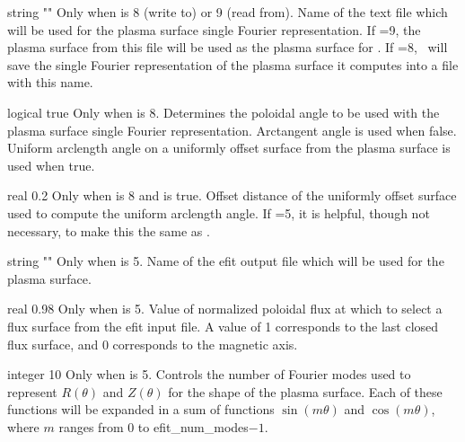 \myhrule

{string}
{{\ttfamily ""}}
{Only when  is 8 (write to) or 9 (read from).}
{Name of the text file which will be used for the plasma surface single Fourier representation. If =9, the plasma surface from
this file will be used as the plasma surface for \regcoil. If =8, \regcoil~will save the single Fourier representation of the plasma surface it computes into a file with this name.}

\myhrule

{logical}
{true}
{Only when  is 8.}
{Determines the poloidal angle to be used with the plasma surface single Fourier representation. Arctangent angle is used when false. Uniform arclength angle on a uniformly offset surface from the plasma surface is used when true.}

\myhrule

{real}
{0.2}
{Only when  is 8 and  is true.}
{Offset distance of the uniformly offset surface used to compute the uniform arclength angle. If =5, it is helpful, though not necessary, to make this the same as .}

\myhrule

{string}
{{\ttfamily ""}}
{Only when  is 5.}
{Name of the {\ttfamily efit} output file which will be used for the plasma surface.}

\myhrule

{real}
{0.98}
{Only when  is 5.}
{Value of normalized poloidal flux at which to select a flux surface from the {\ttfamily efit} input file.
A value of 1 corresponds to the last closed flux surface, and 0 corresponds to the magnetic axis.}

\myhrule

{integer}
{10}
{Only when  is 5.}
{Controls the number of Fourier modes used to represent $R(\theta)$ and $Z(\theta)$ for the shape of
the plasma surface. Each of these functions will be expanded in a sum of functions $\sin(m\theta)$ and $\cos(m\theta)$,
where $m$ ranges from 0 to {\ttfamily efit\_num\_modes}$-1$.}


